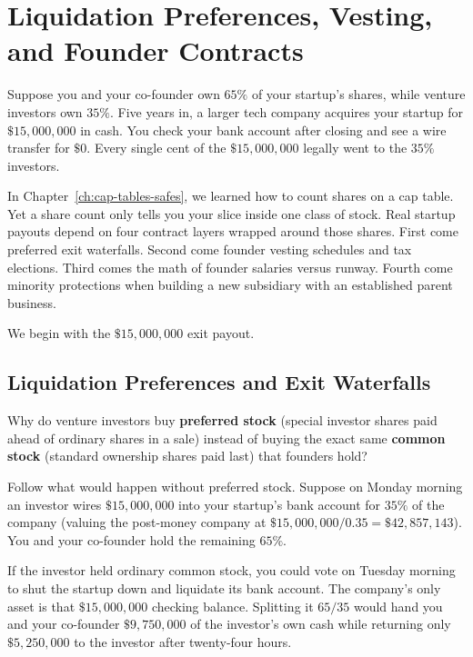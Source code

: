 \chapter{Liquidation Preferences, Vesting, and Founder Contracts}
\label{ch:founder-contracts}
\chapterline

Suppose you and your co-founder own $65\%$ of your startup's shares, while venture investors own $35\%$. Five years in, a larger tech company acquires your startup for $\$15{,}000{,}000$ in cash. You check your bank account after closing and see a wire transfer for $\$0$. Every single cent of the $\$15{,}000{,}000$ legally went to the $35\%$ investors.

In Chapter~\ref{ch:cap-tables-safes}, we learned how to count shares on a cap table. Yet a share count only tells you your slice inside one class of stock. Real startup payouts depend on four contract layers wrapped around those shares. First come preferred exit waterfalls. Second come founder vesting schedules and tax elections. Third comes the math of founder salaries versus runway. Fourth come minority protections when building a new subsidiary with an established parent business.

We begin with the $\$15{,}000{,}000$ exit payout.

\section{Liquidation Preferences and Exit Waterfalls}
\label{sec:liquidation-waterfalls}

Why do venture investors buy \textbf{preferred stock} (special investor shares paid ahead of ordinary shares in a sale) instead of buying the exact same \textbf{common stock} (standard ownership shares paid last) that founders hold?

Follow what would happen without preferred stock. Suppose on Monday morning an investor wires $\$15{,}000{,}000$ into your startup's bank account for $35\%$ of the company (valuing the post-money company at $\$15{,}000{,}000 / 0.35 = \$42{,}857{,}143$). You and your co-founder hold the remaining $65\%$.

If the investor held ordinary common stock, you could vote on Tuesday morning to shut the startup down and liquidate its bank account. The company's only asset is that $\$15{,}000{,}000$ checking balance. Splitting it $65 / 35$ would hand you and your co-founder $\$9{,}750{,}000$ of the investor's own cash while returning only $\$5{,}250{,}000$ to the investor after twenty-four hours.

